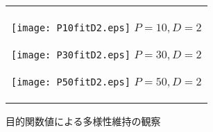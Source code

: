 \documentclass[a4paper,11pt,oneside,openany]{jsbook}
\begin{document}
\begin{figure}[htbp]
  \begin{center}
  \caption{目的関数値による多様性維持の観察}
    \begin{tabular}{c}


      \begin{minipage}{0.33\hsize}
        \begin{center}
          \texttt{[image: P10fitD2.eps]}
          \hspace{1.2cm}$P=10, D=2
 $       \end{center}
      \end{minipage}

      \begin{minipage}{0.33\hsize}
        \begin{center}
          \texttt{[image: P30fitD2.eps]}
          \hspace{1.2cm}$P=30, D=2
 $       \end{center}
      \end{minipage}

      \begin{minipage}{0.33\hsize}
        \begin{center}
          \texttt{[image: P50fitD2.eps]}
          \hspace{1.2cm}$P=50, D=2
 $       \end{center}
      \end{minipage}
    \end{tabular}
  \end{center}
\end{figure}
\end{document}
